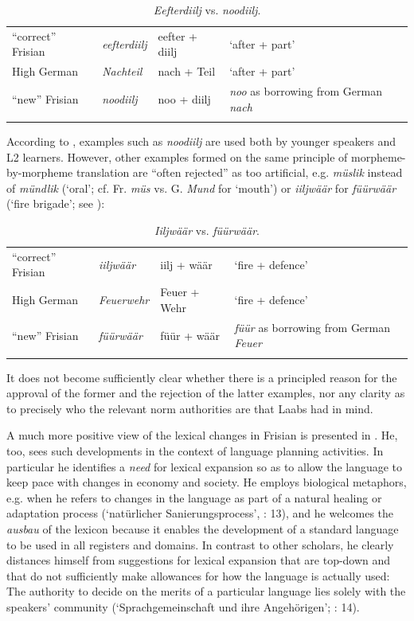 \documentclass[output=paper]{langsci/langscibook}
\begin{document}
\begin{table}
\begin{tabularx}{\textwidth}{Xp{2cm}p{2cm}X}
\lsptoprule
{“correct” Frisian} & \textit{eefterdiilj} & eefter + diilj & ‘after + part’\\
{High German} & \textit{Nachteil} & nach + Teil & ‘after + part’\\
{“new” Frisian} & \textit{noodiilj} & noo + diilj & \textit{noo} as borrowing from German \textit{nach}\\
\lspbottomrule
\end{tabularx}
\caption{\textit{Eefterdiilj} vs. \textit{noodiilj}.}
\label{tab:gregersen:1}
\end{table}

According to \citet[38]{Laabs2009}, examples such as \textit{noodiilj} are used both by younger speakers and L2 learners. However, other examples formed on the same principle of morpheme-by-morpheme translation are “often rejected” as too artificial, e.g. \textit{müslik} instead of \textit{mündlik} (‘oral’; cf. Fr. \textit{müs} vs. G. \textit{Mund} for ‘mouth’) or \textit{iiljwäär} for \textit{füürwäär} (‘fire brigade’; see ): 

\begin{table}
\begin{tabularx}{\textwidth}{Xp{2cm}p{2.5cm}X}
\lsptoprule
“correct” Frisian & \textit{iiljwäär} & iilj + wäär & ‘fire + defence’\\
High German & \textit{Feuerwehr} & Feuer + Wehr & ‘fire + defence’\\
“new” Frisian & \textit{füürwäär} & füür + wäär & \textit{füür} as borrowing from German \textit{Feuer}\\
\lspbottomrule
\end{tabularx}
\caption{\textit{Iiljwäär} vs. \textit{füürwäär}.}
\label{tab:gregersen:2}
\end{table}

It does not become sufficiently clear whether there is a principled reason for the approval of the former and the rejection of the latter examples, nor any clarity as to precisely who the relevant norm authorities are that Laabs had in mind.

A much more positive view of the lexical changes in Frisian is presented in \citet{Arhammar1999}. He, too, sees such developments in the context of language planning activities. In particular he identifies a \textit{need} for lexical expansion so as to allow the language to keep pace with changes in economy and society. He employs biological metaphors, e.g. when he refers to changes in the language as part of a natural healing or adaptation process (‘natürlicher Sanierungsprocess’, \citealt{Arhammar1999}: 13), and he welcomes the \textit{ausbau} of the lexicon because it enables the development of a standard language to be used in all registers and domains. In contrast to other scholars, he clearly distances himself from suggestions for lexical expansion that are top-down and that do not sufficiently make allowances for how the language is actually used: The authority to decide on the merits of a particular language lies solely with the speakers’ community (‘Sprachgemeinschaft und ihre Angehörigen’; \citealt{Arhammar1999}: 14).
\end{document}
